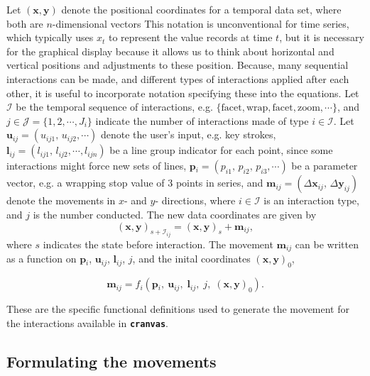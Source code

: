 \documentclass[12pt]{article}
\begin{document}
Let $(\mathbf{x},\mathbf{y})$ denote the positional coordinates
for a temporal data set, where both are $n$-dimensional vectors
This notation is unconventional for time series, which typically
uses $x_t$ to represent the value records at time $t$, but it is
necessary for the graphical display because it allows us to think
about horizontal and vertical positions and adjustments to these
position. Because, many sequential interactions can be made, and
different types of interactions applied after each other, it is
useful to incorporate notation specifying these into the equations.
Let $\mathcal{I}$ be the temporal sequence of interactions,
e.g. $\{\textrm{facet},\textrm{wrap},\textrm{facet},
\textrm{zoom},\cdots\}$, and $j\in\mathcal{J}=\{1,2,\cdots,
J_{i}\}$ indicate the number of interactions made of type $i\in
\mathcal{I}$. Let $\mathbf{u}{}_{ij}=(u_{ij1},\, u_{ij2},\cdots)$
denote the user's input, e.g. key strokes,
$\mathbf{l}{}_{ij}=(l_{ij1},\, l_{ij2},\cdots, l_{ijn})$
be a line group indicator for each point, since some interactions might force new sets of lines,
$\mathbf{p}{}_{i}=(p_{i1},\, p_{i2},\, p_{i3},\cdots)$
be a parameter vector, e.g. a wrapping stop value of 3 points in series, and
$\mathbf{m}{}_{ij}=(\Delta\mathbf{x}{}_{ij},\,\Delta\mathbf{y}_{ij})$
denote the movements in $x$- and $y$- directions, where $i\in\mathcal{I}$
is an interaction type, and $j$ is the number conducted.
The new data coordinates are given by
\[
(\mathbf{x},\mathbf{y})_{s+\mathcal{I}_{ij}}=(\mathbf{x},\mathbf{y})_{s}+\mathbf{m}{}_{ij},
\]
where $s$ indicates the state before interaction.
The movement $\mathbf{m}{}_{ij}$ can be written as a function on $\mathbf{p}{}_{i}$,
$\mathbf{u}{}_{ij}$, $\mathbf{l}_{ij}$, $j$, and the inital
coordinates $(\mathbf{x},\mathbf{y})_0$,

\[
\mathbf{m}{}_{ij}=f_{i}(\mathbf{p}{}_{i},\:\mathbf{u}{}_{ij},\;\mathbf{l}_{ij},\; j,\; (\mathbf{x},\mathbf{y})_{0} ).
\]

\noindent These are the specific functional definitions used to generate the movement for the interactions available in \texttt{\textbf{cranvas}}.

\subsection{Formulating the movements}
\end{document}
